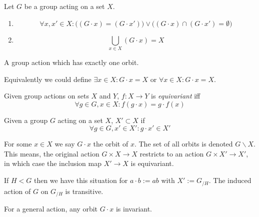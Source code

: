 \begin{proposition}
   Let \(G\) be a group acting on a set \(X\).
   \begin{enumerate}[label=\roman*, align=Center]
      \item \[\forall x, x' \in X: \big((G \cdot x) = (G \cdot x')\big) \lor \big((G \cdot x) \cap (G \cdot x') = \emptyset\big)\]
      \item \[\bigcup_{x \in X} (G \cdot x) = X\]
   \end{enumerate}
\end{proposition}

\begin{definition}
   A group action which has exactly one orbit.
\end{definition}
\begin{remark}
   Equivalently we could define \(\exists x \in X: G \cdot x = X\) or \(\forall x \in X: G \cdot x = X\).
\end{remark}

\begin{definition}
   Given group actions on sets \(X\) and \(Y\), \(f: X \to Y\) is \emph{equivariant} iff
   \[\forall g \in G, x \in X: f(g \cdot x) = g \cdot f(x)\]
\end{definition}

\begin{definition}
   Given a group \(G\) acting on a set \(X\), \(X' \subset X\) if
   \[\forall g \in G, x' \in X': g \cdot x' \in X'\]
\end{definition}
\begin{remark}
   For some \(x \in X\) we say \(G \cdot x\) the orbit of \(x\).
   The set of all orbits is denoted \(G\backslash X\).
   This means, the original action \(G \times X \to X\) restricts to an action \(G \times X' \to X'\), in which case the inclusion map \(X' \to X\) is equivariant.
\end{remark}
\begin{example}
   If \(H < G\) then we have this situation for \(a \cdot b := ab\) with \(X' := G_{/H}\).
   The induced action of \(G\) on \(G_{/H}\) is transitive.

   For a general action, any orbit \(G \cdot x\) is invariant.
\end{example}


